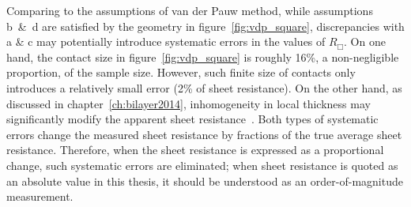 Comparing to the assumptions of van der Pauw method, while assumptions b~\&~d are satisfied by the geometry in figure~\ref{fig:vdp_square}, discrepancies with a \& c may potentially introduce systematic errors in the values of $R_\Box$. On one hand, the contact size in figure~\ref{fig:vdp_square} is roughly 16\%, a non-negligible proportion, of the sample size. However, such finite size of contacts only introduces a relatively small error (2\% of sheet resistance). On the other hand, as discussed in chapter~\ref{ch:bilayer2014}, inhomogeneity in local thickness may significantly modify the apparent sheet resistance~\cite{Landauer_Porous_Media}. Both types of systematic errors change the measured sheet resistance by fractions of the true average sheet resistance. Therefore, when the sheet resistance is expressed as a proportional change, such systematic errors are eliminated; when sheet resistance is quoted as an absolute value in this thesis, it should be understood as an order-of-magnitude measurement.